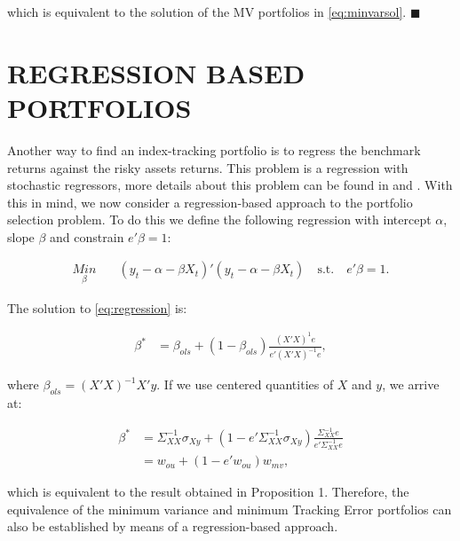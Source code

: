 \documentclass[12pt,oneside,a4paper]{memoir}
\begin{document}
\noindent
which is equivalent to the solution of the MV portfolios in \eqref{eq:minvarsol}. $\blacksquare$

\section{REGRESSION BASED PORTFOLIOS} \label{sec:regression}

Another way to find an index-tracking portfolio is to regress the benchmark returns against the risky assets returns.
This problem is a regression with stochastic regressors, more details about this problem can be found in  and .
With this in mind, we now consider a regression-based approach to the portfolio selection problem.
To do this we define the following regression with intercept $\alpha$, slope $\beta$ and constrain $e'\beta=1$:

\vspace{-18 pt}
\begin{align}\label{eq:regression} 
\underset{\beta}{Min} & \quad (y_t - \alpha - \beta X_t)'(y_t - \alpha - \beta X_t)
\quad \text{s.t.} \quad  e'\beta=1.
\end{align}

\noindent
The solution to \eqref{eq:regression} is:

\vspace{-18 pt}
\begin{align*}
\beta^* &= \beta_{ols} + (1 - \beta_{ols}) \frac{(X'X)^{1}e}{e'(X'X)^{-1}e},
\end{align*}

\noindent
where $\beta_{ols} = (X'X)^{-1}X'y$. If we use centered quantities of $X$ and $y$, we arrive at:

\vspace{-18 pt}
\begin{align*}
\beta^* &= \Sigma_{XX}^{-1} \sigma_{Xy}
+ (1 - e'\Sigma_{XX}^{-1} \sigma_{Xy})
\frac{\Sigma_{XX}^{-1}e}{e'\Sigma_{XX}^{-1}e}
\\
 &= w_{ou} + (1 - e'w_{ou})w_{mv}, 
\end{align*}

\noindent
which is equivalent to the result obtained in Proposition 1. Therefore, the equivalence of the minimum variance and minimum Tracking Error portfolios can also be established by means of a regression-based approach.
\end{document}
